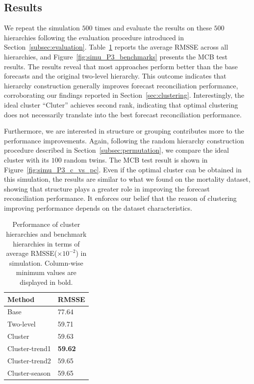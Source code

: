 \documentclass[a4paper,review,12pt,authoryear]{elsarticle}
\begin{document}
\subsection{Results}
\label{sec:simu_res}

We repeat the simulation $500$ times and evaluate the results on these $500$ hierarchies following the evaluation procedure introduced in Section~\ref{subsec:evaluation}.
Table~\ref{tab:simu_P3} reports the average RMSSE across all hierarchies, and
Figure~\ref{fig:simu_P3_benchmarks} presents the MCB test results. The results reveal that most approaches perform better than the base forecasts and the original two-level hierarchy. This outcome indicates that hierarchy construction generally improves forecast reconciliation performance, corroborating our findings reported in Section~\ref{sec:clustering}. 
Interestingly, the ideal cluster ``Cluter'' achieves second rank, indicating that optimal clustering does not necessarily translate into the best forecast reconciliation performance. 

Furthermore, we are interested in structure or grouping contributes more to the performance improvements. Again, following the random hierarchy construction procedure described in Section~\ref{subsec:permutation}, we compare the ideal cluster with its $100$ random twins. The MCB test result is shown in Figure~\ref{fig:simu_P3_c_vs_pc}. Even if the optimal cluster can be obtained in this simulation, the results are similar to what we found on the mortality dataset, showing that  structure plays a greater role in improving the forecast reconciliation performance. It enforces our belief that the reason of clustering improving performance depends on the dataset characteristics.


\begin{table}[!ht]
    \centering
    \caption{\label{tab:simu_P3}Performance of cluster hierarchies and benchmark hierarchies in terms of average RMSSE($\times 10^{-2}$) in simulation. Column-wise minimum values are displayed in bold.}
    \begin{tabular}{ll}\toprule
        Method & RMSSE \\ \midrule
        Base & 77.64 \\ 
        Two-level & 59.71 \\ 
        Cluster & 59.63 \\ 
        Cluster-trend1 & \textbf{59.62} \\ 
        Cluster-trend2 & 59.65 \\ 
        Cluster-season & 59.65 \\ \bottomrule
    \end{tabular}
\end{table}
\end{document}
